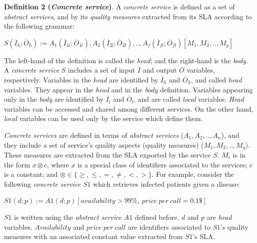 \noindent \textbf{Definition 2 (\textit{Concrete service})}. A \textit{concrete service} is defined as a set of \textit{abstract services}, and by its \textit{quality measures} extracted from its SLA according to the following grammar:
%
\begin{center}
\begin{math}
S (\overline{I}_{h}; \overline{O}_{h}) := A_{1}(\overline{I}_{1l}; \overline{O}_{1l}), A_{2}(\overline{I}_{2l}; \overline{O}_{2l}), ..,  A_{f}(\overline{I}_{fl}; \overline{O}_{fl})[M_{1},M_{2}, ..,M_{g}]
\end{math}
\end{center}
%
The left-hand of the definition is called the \textit{head}; and the right-hand is the \textit{body}. 
A \textit{concrete service} $S$ includes a set of input $\overline{I}$ and output $\overline{O}$ variables, respectively.
Variables in the \textit{head} are identified by $\overline{I}_{h}$ and $\overline{O}_{h}$, and called \textit{head} variables. 
They appear in the \textit{head} and in the \textit{body} definition. 
Variables appearing only in the \textit{body} are identified by $\overline{I}_{l}$ and $\overline{O}_{l}$, and are called \textit{local} variables. \textit{Head} variables can be accessed and shared among different services. On the other hand, \textit{local} variables can be used only by the service which define them.

\textit{Concrete services} are defined in terms of \textit{abstract services} ($A_{1}, A_{2}, .., A_{n}$), and they include a set of service's quality aspects (quality measures) ($M_{1},M_{2}, .., M_{g}$). 
These measures are extracted from the SLA exported by the service $S$.
%
%
$M_{i}$ is in the form $x \otimes c$, where $x$ is a special class of identifiers associated to the services; $c$ is a constant; and $\otimes \in\lbrace \geq, \leq, =, \neq, <, >\rbrace$. For example, consider the following \textit{concrete service} $S1$ which retrieves infected patients given a disease: 
\begin{center}
\small
\begin{math}
S1(d; p) := A1(d; p)[availability > 99\%, \ price \ per \ call = 0.1\$]
\end{math}
\end{center}
%
$S1$ is written using the \textit{abstract service} $A1$ defined before.
$d$ and $p$ are \textit{head} variables. 
$Availability$ and $price \ per \ call$ are identifiers associated to $S1$'s quality measures with an associated constant value extracted from $S1$'s SLA.
%

